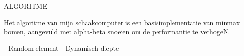 ALGORITME

Het algoritme van mijn schaakcomputer is een basisimplementatie van minmax bomen, aangevuld met alpha-beta snoeien om de performantie te verhogeN.

- Random element
- Dynamisch diepte
